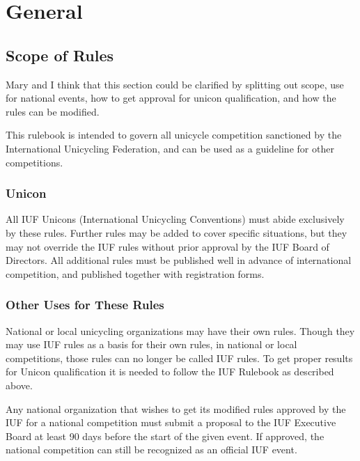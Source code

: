 \chapter{General}

\section{Scope of Rules}

\begin{comment2016}
Mary and I think that this section could be clarified by splitting out scope, use for national events, how to get approval for unicon qualification, and how the rules can be modified.
\end{comment2016}

This rulebook is intended to govern all unicycle competition sanctioned by the International Unicycling Federation, and can be used as a guideline for other competitions.

\subsection{Unicon}

All IUF Unicons (International Unicycling Conventions) must abide exclusively by these rules.
Further rules may be added to cover specific situations, but they may not override the IUF rules without prior approval by the IUF Board of Directors.
All additional rules must be published well in advance of international competition, and published together with registration forms.

\subsection{Other Uses for These Rules}

National or local unicycling organizations may have their own rules.
Though they may use IUF rules as a basis for their own rules, in national or local competitions, those rules can no longer be called IUF rules.
To get proper results for Unicon qualification it is needed to follow the IUF Rulebook as described above.

Any national organization that wishes to get its modified rules approved by the IUF for a national competition must submit a proposal to the IUF Executive Board at least 90 days before the start of the given event.
If approved, the national competition can still be recognized as an official IUF event.

